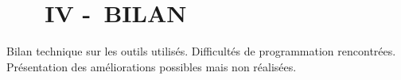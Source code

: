 \chapter[~~~BILAN]{~~~IV -~BILAN}%
\label{cls}

Bilan technique sur les outils utilisés. Difficultés de programmation rencontrées. Présentation des améliorations possibles mais non réalisées.